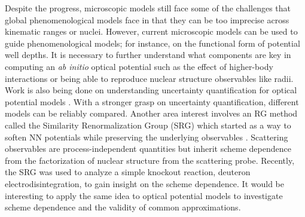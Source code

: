 \documentclass[preprintnumbers,floatfix,aps,prc,preprint,nofootinbib]{revtex4-1}
\begin{document}
Despite the progress, microscopic models still face some of the challenges that global phenomenological models face in that they can be too imprecise across kinematic ranges or nuclei. However, current microscopic models can be used to guide phenomenological models; for instance, on the functional form of potential well depths. It is necessary to further understand what components are key in computing an \textit{ab initio} optical potential such as the effect of higher-body interactions or being able to reproduce nuclear structure observables like radii. Work is also being done on understanding uncertainty quantification for optical potential models \cite{King:2018vzw}. With a stronger grasp on uncertainty quantification, different models can be reliably compared. Another area interest involves an RG method called the Similarity Renormalization Group (SRG) which started as a way to soften NN potentials while preserving the underlying observables \cite{Bogner:2006pc, Bogner:2009bt}. Scattering observables are process-independent quantities but inherit scheme dependence from the factorization of nuclear structure from the scattering probe. Recently, the SRG was used to analyze a simple knockout reaction, deuteron electrodisintegration, to gain insight on the scheme dependence. It would be interesting to apply the same idea to optical potential models to investigate scheme dependence and the validity of common approximations.





\end{document}
